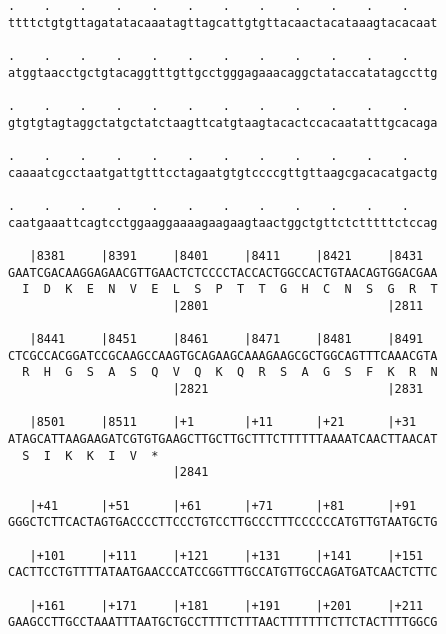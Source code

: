 \documentclass{article}
\begin{document}
\begin{Verbatim}
.    .    .    .    .    .    .    .    .    .    .    .    
ttttctgtgttagatatacaaatagttagcattgtgttacaactacataaagtacacaat
                                                            
.    .    .    .    .    .    .    .    .    .    .    .    
atggtaacctgctgtacaggtttgttgcctgggagaaacaggctataccatatagccttg
                                                            
.    .    .    .    .    .    .    .    .    .    .    .    
gtgtgtagtaggctatgctatctaagttcatgtaagtacactccacaatatttgcacaga
                                                            
.    .    .    .    .    .    .    .    .    .    .    .    
caaaatcgcctaatgattgtttcctagaatgtgtccccgttgttaagcgacacatgactg
                                                            
.    .    .    .    .    .    .    .    .    .    .    .    
caatgaaattcagtcctggaaggaaaagaagaagtaactggctgttctctttttctccag
                                                            
   |8381     |8391     |8401     |8411     |8421     |8431  
GAATCGACAAGGAGAACGTTGAACTCTCCCCTACCACTGGCCACTGTAACAGTGGACGAA
  I  D  K  E  N  V  E  L  S  P  T  T  G  H  C  N  S  G  R  T
                       |2801                         |2811  
  
   |8441     |8451     |8461     |8471     |8481     |8491  
CTCGCCACGGATCCGCAAGCCAAGTGCAGAAGCAAAGAAGCGCTGGCAGTTTCAAACGTA
  R  H  G  S  A  S  Q  V  Q  K  Q  R  S  A  G  S  F  K  R  N
                       |2821                         |2831  
  
   |8501     |8511     |+1       |+11      |+21      |+31   
ATAGCATTAAGAAGATCGTGTGAAGCTTGCTTGCTTTCTTTTTTAAAATCAACTTAACAT
  S  I  K  K  I  V  *   
                       |2841                                
  
   |+41      |+51      |+61      |+71      |+81      |+91   
GGGCTCTTCACTAGTGACCCCTTCCCTGTCCTTGCCCTTTCCCCCCATGTTGTAATGCTG
                                                            
   |+101     |+111     |+121     |+131     |+141     |+151  
CACTTCCTGTTTTATAATGAACCCATCCGGTTTGCCATGTTGCCAGATGATCAACTCTTC
                                                            
   |+161     |+171     |+181     |+191     |+201     |+211  
GAAGCCTTGCCTAAATTTAATGCTGCCTTTTCTTTAACTTTTTTTCTTCTACTTTTGGCG
                                                            

\end{Verbatim}
\end{document}
